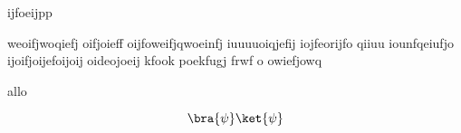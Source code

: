 \documentclass[letterpaper,oneside,final]{tufte-handout}
\begin{document}
ijfoeijpp 

weoifjwoqiefj oifjoieff oijfoweifjqwoeinfj iuuuuoiqjefij iojfeorijfo qiiuu      iounfqeiufjo ijoifjoijefoijoij  oideojoeij
kfook poekfugj frwf o
 owiefjowq\\
\begin{note}
    allo
\end{note}
\[
\bra{\psi} \ket{\psi} 
\]


 


\end{document}
